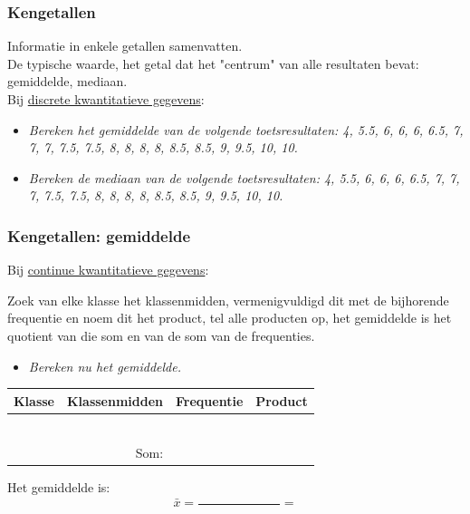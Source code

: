 \documentclass[dutch]{beamer}
\newcommand{\vraag}[1]{\begin{itemize}\item[Vraag:] {\it #1}\end{itemize}}
\begin{document}
\begin{frame}
\frametitle{Kengetallen}
Informatie in enkele getallen samenvatten.\\
\vspace*{0.5cm}
\pause
De typische waarde, het getal dat het "centrum" van alle resultaten bevat:\\
\pause
gemiddelde, mediaan.\\
\vspace*{0.5cm}
\pause
Bij \underline{discrete kwantitatieve gegevens}:
\vraag{Bereken het gemiddelde van de volgende toetsresultaten: 4, 5.5, 6, 6, 6, 6.5, 7, 7, 7, 7.5, 7.5, 8, 8, 8, 8, 8.5, 8.5, 9, 9.5, 10, 10.}
\vspace*{1cm}
\pause
\vraag{Bereken de mediaan van de volgende toetsresultaten: 4, 5.5, 6, 6, 6, 6.5, 7, 7, 7, 7.5, 7.5, 8, 8, 8, 8, 8.5, 8.5, 9, 9.5, 10, 10.}
\vspace*{1cm}
\end{frame}
\begin{frame}


\frametitle{Kengetallen: gemiddelde}
Bij \underline{continue kwantitatieve gegevens}:\\
\begin{description}
\scriptsize
  \item[gemiddelde:] Zoek van elke klasse het klassenmidden, vermenigvuldigd dit met de bijhorende frequentie en noem dit het product, tel alle producten op, het gemiddelde is het quotient van die som en van de som van de frequenties.
\end{description}
\pause
\vraag{Bereken nu het gemiddelde.}
\begin{center}
  \begin{tabular}{|p{2cm}|p{3cm}|p{2cm}|p{2cm}|}
    \hline
    Klasse & Klassenmidden & Frequentie & Product\\
    \hline&&&\\\hline&&&\\\hline&&&\\\hline&&&\\\hline&&&\\
    \hline&&&\\\hline
    \multicolumn{2}{r|}{Som:} & &\\\cline{3-4}
  \end{tabular}
\end{center}
Het gemiddelde is:
$$
\bar{x}=\frac{\phantom{.......................}}{\phantom{.....................}}=
$$
\vspace*{0.5cm}
\end{frame}
\end{document}
